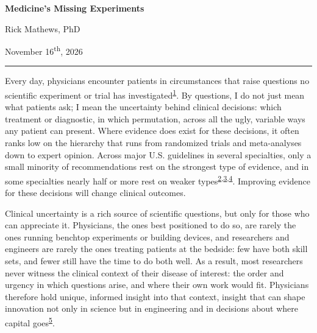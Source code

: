 \documentclass[12pt]{article}
\begin{document}
\RaggedRight
\begin{center}
  {\fontsize{21}{25.2}\selectfont\bfseries Medicine's Missing Experiments\par}
  \vspace{9pt}
  {\large Rick Mathews, PhD\par}
  \vspace{3pt}
  {\small November 16\textsuperscript{th}, 2026\par}
\end{center}
\vspace{2pt}
{\color{rule}\noindent\rule{\textwidth}{0.4pt}}\par
\vspace{-4pt}

\fontsize{13.0}{18.85}\selectfont
\setlength{\parskip}{6.5pt}
Every day, physicians encounter patients in circumstances that raise questions no scientific experiment or trial has investigated\textsuperscript{\hyperlink{ref-delfiol2014}{1}}. By questions, I do not just mean what patients ask; I mean the uncertainty behind clinical decisions: which treatment or diagnostic, in which permutation, across all the ugly, variable ways any patient can present. Where evidence does exist for these decisions, it often ranks low on the hierarchy that runs from randomized trials and meta-analyses down to expert opinion. Across major U.S. guidelines in several specialties, only a small minority of recommendations rest on the strongest type of evidence, and in some specialties nearly half or more rest on weaker types\textsuperscript{\hyperlink{ref-fanaroff2019}{2}}\textsuperscript{,}\textsuperscript{\hyperlink{ref-poonacha2011}{3}}\textsuperscript{,}\textsuperscript{\hyperlink{ref-lee2011}{4}}. Improving evidence for these decisions will change clinical outcomes.

Clinical uncertainty is a rich source of scientific questions, but only for those who can appreciate it. Physicians, the ones best positioned to do so, are rarely the ones running benchtop experiments or building devices, and researchers and engineers are rarely the ones treating patients at the bedside: few have both skill sets, and fewer still have the time to do both well. As a result, most researchers never witness the clinical context of their disease of interest: the order and urgency in which questions arise, and where their own work would fit. Physicians therefore hold unique, informed insight into that context, insight that can shape innovation not only in science but in engineering and in decisions about where capital goes\textsuperscript{\hyperlink{ref-wsj}{5}}.
\end{document}
